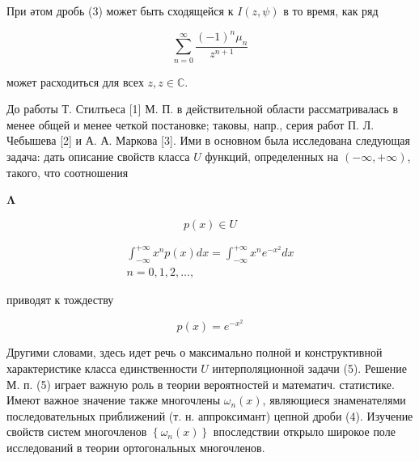 \documentclass[10pt]{article}
\begin{document}
При әтом дробь (3) может быть сходящейся к $I(z, \psi)$ в то время, как ряд



\[

\sum_{n=0}^{\infty} \frac{(-1)^{n} \mu_{n}}{z^{n+1}}

\]



может расходиться для всех $z, z \in \mathbb{C}$.



До работы Т. Стилтьеса [1] М. П. в действительной области рассматривалась в менее общей и менее четкой постановке; таковы, напр., серия работ П. Л. Чебышева [2] и А. А. Маркова [3]. Ими в основном была исследована следующая задача: дать описание свойств класса $U$ функций, определенных на $(-\infty,+\infty)$, такого, что соотношения



$\boldsymbol{\Lambda}$



\[

p(x) \in U

\]



\[

\begin{gathered}

\int_{-\infty}^{+\infty} x^{n} p(x) d x=\int_{-\infty}^{+\infty} x^{n} e^{-x^{2}} d x \\

n=0,1,2, \ldots,

\end{gathered}

\]



приводят к тождеству



\[

p(x)=e^{-x^{2}}

\]



Другими словами, здесь идет речь о максимально полной и конструктивной характеристике класса единственности $U$ интерполяционной задачи (5). Решение М. п. (5) играет важную роль в теории вероятностей и математич. статистике. Имеют важное значение также многочлены $\omega_{n}(x)$, являющиеся знаменателями последовательных приближений (т. н. аппроксимант) цепной дроби (4). Изучение свойств систем многочленов $\left\{\omega_{n}(x)\right\}$ впоследствии открыло широкое поле исследований в теории ортогональных многочленов.
\end{document}
